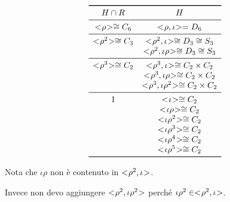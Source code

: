 \[
	\begin{array}{cc}
		\toprule
		H \cap R & H \\
		\midrule
		\gen{\rho} \isomorfo C_6 & \gen{\rho, \iota} = D_6 \\
		\midrule
		\gen{\rho^2} \isomorfo C_3 & \gen{\rho^2, \iota} \isomorfo D_3 \isomorfo S_3 \\
			& \gen{\rho^2, \iota\rho} \isomorfo D_3 \isomorfo S_3 \\
		\midrule
		\gen{\rho^3} \isomorfo C_2 & \gen{\rho^3, \iota} \isomorfo C_2 \times C_2 \\
			& \gen{\rho^3, \iota\rho} \isomorfo C_2 \times C_2 \\
			& \gen{\rho^3, \iota\rho^2} \isomorfo C_2 \times C_2 \\
		\midrule
		1 & \gen{\iota} \isomorfo C_2 \\
			& \gen{\iota\rho} \isomorfo C_2 \\
			& \gen{\iota\rho^2} \isomorfo C_2 \\
			& \gen{\iota\rho^3} \isomorfo C_2 \\
			& \gen{\iota\rho^4} \isomorfo C_2 \\
			& \gen{\iota\rho^5} \isomorfo C_2 \\
		\bottomrule
	\end{array}
\]

Nota che $\iota\rho$ non è contenuto in $< \negmedspace \rho^2, \iota \negmedspace >$.

Invece non devo aggiungere $< \negmedspace \rho^2, \iota\rho^2 \negmedspace >$ perché $\iota\rho^2 \in < \negmedspace \rho^2, \iota \negmedspace >$.
